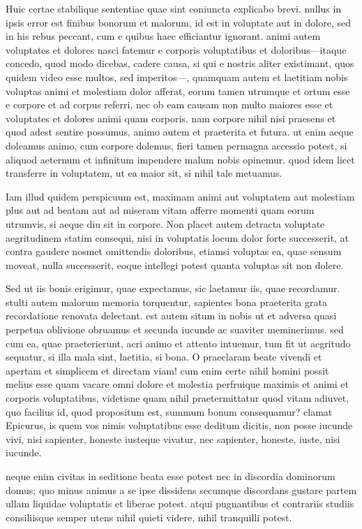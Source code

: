  Huic certae stabilique sententiae quae sint coniuncta explicabo brevi. nullus in ipsis error est finibus bonorum et malorum, id est in voluptate aut in dolore, sed in his rebus peccant, cum e quibus haec efficiantur ignorant. animi autem voluptates et dolores nasci fatemur e corporis voluptatibus et doloribus—itaque concedo, quod modo dicebas, cadere causa, si qui e nostris aliter existimant, quos quidem video esse multos, sed imperitos—, quamquam autem et laetitiam nobis voluptas animi et molestiam dolor afferat, eorum tamen utrumque et ortum esse e corpore et ad corpus referri, nec ob eam causam non multo maiores esse et voluptates et dolores animi quam corporis. nam corpore nihil nisi praesens et quod adest sentire possumus, animo autem et praeterita et futura. ut enim aeque doleamus animo, cum corpore dolemus, fieri tamen permagna accessio potest, si aliquod aeternum et infinitum impendere malum nobis opinemur. quod idem licet transferre in voluptatem, ut ea maior sit, si nihil tale metuamus.

 Iam illud quidem perspicuum est, maximam animi aut voluptatem aut molestiam plus aut ad beatam aut ad miseram vitam afferre momenti quam eorum utrumvis, si aeque diu sit in corpore. Non placet autem detracta voluptate aegritudinem statim consequi, nisi in voluptatis locum dolor forte successerit, at contra gaudere nosmet omittendis doloribus, etiamsi voluptas ea, quae sensum moveat, nulla successerit, eoque intellegi potest quanta voluptas sit non dolere.

 Sed ut iis bonis erigimur, quae expectamus, sic laetamur iis, quae recordamur. stulti autem malorum memoria torquentur, sapientes bona praeterita grata recordatione renovata delectant. est autem situm in nobis ut et adversa quasi perpetua oblivione obruamus et secunda iucunde ac suaviter meminerimus. sed cum ea, quae praeterierunt, acri animo et attento intuemur, tum fit ut aegritudo sequatur, si illa mala sint, laetitia, si bona. O praeclaram beate vivendi et apertam et simplicem et directam viam! cum enim certe nihil homini possit melius esse quam vacare omni dolore et molestia perfruique maximis et animi et corporis voluptatibus, videtisne quam nihil praetermittatur quod vitam adiuvet, quo facilius id, quod propositum est, summum bonum consequamur? clamat Epicurus, is quem vos nimis voluptatibus esse deditum dicitis, non posse iucunde vivi, nisi sapienter, honeste iusteque vivatur, nec sapienter, honeste, iuste, nisi iucunde.

 neque enim civitas in seditione beata esse potest nec in discordia dominorum domus; quo minus animus a se ipse dissidens secumque discordans gustare partem ullam liquidae voluptatis et liberae potest. atqui pugnantibus et contrariis studiis consiliisque semper utens nihil quieti videre, nihil tranquilli potest.

